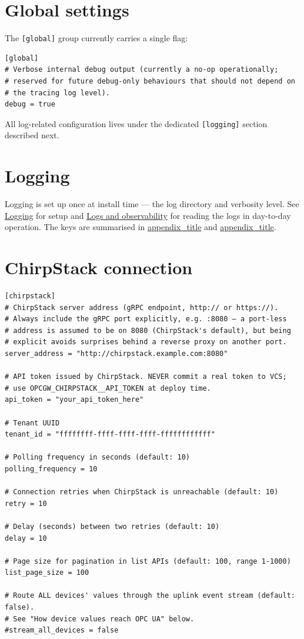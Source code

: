 \section{Global settings}\label{sec-global-config}

The \texttt{{[}global{]}} group currently carries a single flag:

\begin{lstlisting}
[global]
# Verbose internal debug output (currently a no-op operationally;
# reserved for future debug-only behaviours that should not depend on
# the tracing log level).
debug = true
\end{lstlisting}

All log-related configuration lives under the dedicated \texttt{{[}logging{]}} section described next.

\section{Logging}\label{sec-logging-config}

Logging is set up once at install time --- the log directory and verbosity level. See \hyperref[sec-install-logging]{Logging} for setup and \hyperref[sec-logs-observability]{Logs and observability} for reading the logs in day-to-day operation. The keys are summarised in \hyperref[app-config-reference]{appendix\_title} and \hyperref[app-env-reference]{appendix\_title}.

\section{ChirpStack connection}\label{sec-chirpstack-config}

\begin{lstlisting}
[chirpstack]
# ChirpStack server address (gRPC endpoint, http:// or https://).
# Always include the gRPC port explicitly, e.g. :8080 — a port-less
# address is assumed to be on 8080 (ChirpStack's default), but being
# explicit avoids surprises behind a reverse proxy on another port.
server_address = "http://chirpstack.example.com:8080"

# API token issued by ChirpStack. NEVER commit a real token to VCS;
# use OPCGW_CHIRPSTACK__API_TOKEN at deploy time.
api_token = "your_api_token_here"

# Tenant UUID
tenant_id = "ffffffff-ffff-ffff-ffff-ffffffffffff"

# Polling frequency in seconds (default: 10)
polling_frequency = 10

# Connection retries when ChirpStack is unreachable (default: 10)
retry = 10

# Delay (seconds) between two retries (default: 10)
delay = 10

# Page size for pagination in list APIs (default: 100, range 1-1000)
list_page_size = 100

# Route ALL devices' values through the uplink event stream (default: false).
# See "How device values reach OPC UA" below.
#stream_all_devices = false
\end{lstlisting}

